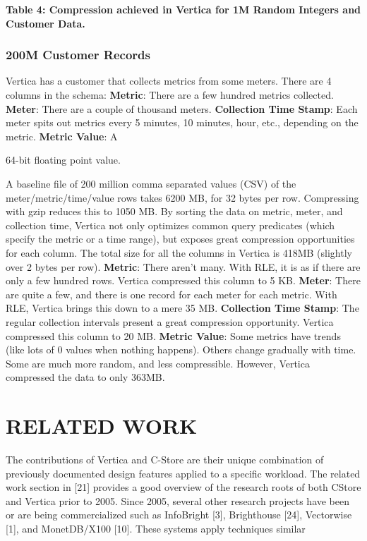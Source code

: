 \documentclass[a4paper,12pt,notitlepage,twoside,openright]{article}
\begin{document}
\textbf{Table 4: Compression achieved in Vertica for 1M Random Integers
and Customer Data.}

\hypertarget{m-customer-records}{%
\subsubsection{200M Customer Records}\label{m-customer-records}}

Vertica has a customer that collects metrics from some meters. There are
4 columns in the schema: \textbf{Metric}: There are a few hundred
metrics collected. \textbf{Meter}: There are a couple of thousand
meters. \textbf{Collection Time Stamp}: Each meter spits out metrics
every 5 minutes, 10 minutes, hour, etc., depending on the metric.
\textbf{Metric Value}: A

64-bit floating point value.

A baseline file of 200 million comma separated values (CSV) of the
meter/metric/time/value rows takes 6200 MB, for 32 bytes per row.
Compressing with gzip reduces this to 1050 MB. By sorting the data on
metric, meter, and collection time, Vertica not only optimizes common
query predicates (which specify the metric or a time range), but exposes
great compression opportunities for each column. The total size for all
the columns in Vertica is 418MB (slightly over 2 bytes per row).
\textbf{Metric}: There aren't many. With RLE, it is as if there are only
a few hundred rows. Vertica compressed this column to 5 KB.
\textbf{Meter}: There are quite a few, and there is one record for each
meter for each metric. With RLE, Vertica brings this down to a mere 35
MB. \textbf{Collection Time Stamp}: The regular collection intervals
present a great compression opportunity. Vertica compressed this column
to 20 MB. \textbf{Metric Value}: Some metrics have trends (like lots of
0 values when nothing happens). Others change gradually with time. Some
are much more random, and less compressible. However, Vertica compressed
the data to only 363MB.

\hypertarget{related-work}{%
\section{RELATED WORK}\label{related-work}}

The contributions of Vertica and C-Store are their unique combination of
previously documented design features applied to a specific workload.
The related work section in {[}21{]} provides a good overview of the
research roots of both CStore and Vertica prior to 2005. Since 2005,
several other research projects have been or are being commercialized
such as InfoBright {[}3{]}, Brighthouse {[}24{]}, Vectorwise {[}1{]},
and MonetDB/X100 {[}10{]}. These systems apply techniques similar
\end{document}
